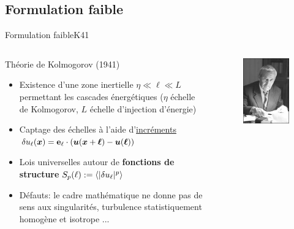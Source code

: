 \documentclass[aspectratio=169,usenames,dvipsnames]{beamer}
\begin{document}
\subsection{Formulation faible}
\begin{frame}{Formulation faible}{K41}
\centering
\begin{columns}
    \begin{block}{Théorie de Kolmogorov (1941)}
        \begin{itemize}[label=]
            \item Existence d'une zone inertielle $\eta\ll \ell\ll L$ permettant les cascades énergétiques
                  ($\eta$ échelle de Kolmogorov, $L$ échelle d'injection d'énergie)
            \item Captage des échelles à l'aide d'\ul{incr\'ements} $\delta u_\ell(\boldsymbol{x})=\mathbf{e}_{\ell}
                  \cdot\qty(\boldsymbol{u}(\boldsymbol{x}+\boldsymbol{\ell})-\boldsymbol{u}(\boldsymbol{\ell}))$
            \item Lois universelles autour de {\bf fonctions de structure} $S_p(\ell):=\left\langle |\delta u_\ell|^p\right\rangle$
            \item Défauts: le cadre mathématique ne donne pas de sens aux singularités, 
                  turbulence statistiquement homogène et isotrope ...
        \end{itemize}
    \end{block}\hfill
    \begin{figure}
        \includegraphics[height=.4\textheight, center]{figs/Andrej-Kolmogorov_595e00fb51178.jpg}
    \end{figure}
\end{columns}
\end{frame} %
\end{document}

